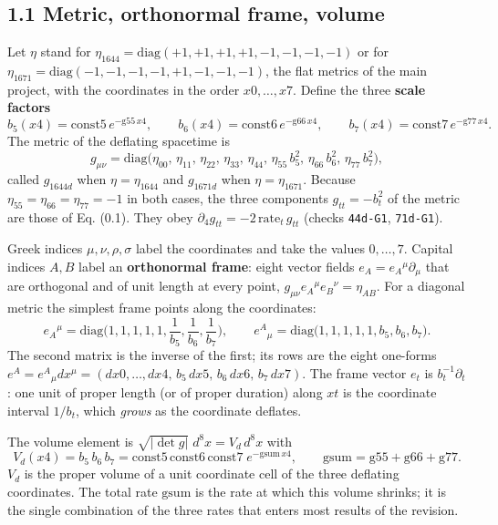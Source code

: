 \documentclass[
  10pt,
]{article}
\begin{document}
\hypertarget{metric-orthonormal-frame-volume}{%
\subsection{1.1 Metric, orthonormal frame,
volume}\label{metric-orthonormal-frame-volume}}

Let \(\eta\) stand for
\(\eta_{1644}=\mathrm{diag}(+1,+1,+1,+1,-1,-1,-1,-1)\) or for
\(\eta_{1671}=\mathrm{diag}(-1,-1,-1,-1,+1,-1,-1,-1)\), the flat metrics
of the main project, with the coordinates in the order \(x0,\dots,x7\).
Define the three \textbf{scale factors}
\[b_5(x4)=\mathrm{const5}\,e^{-\mathrm{g55}\,x4},\qquad
b_6(x4)=\mathrm{const6}\,e^{-\mathrm{g66}\,x4},\qquad
b_7(x4)=\mathrm{const7}\,e^{-\mathrm{g77}\,x4}.\tag{1.1}\] The metric of
the deflating spacetime is
\[g_{\mu\nu}=\mathrm{diag}\big(\eta_{00},\,\eta_{11},\,\eta_{22},\,\eta_{33},\,\eta_{44},\,
\eta_{55}\,b_5^2,\,\eta_{66}\,b_6^2,\,\eta_{77}\,b_7^2\big),\tag{1.2}\]
called \(g_{1644d}\) when \(\eta=\eta_{1644}\) and \(g_{1671d}\) when
\(\eta=\eta_{1671}\). Because \(\eta_{55}=\eta_{66}=\eta_{77}=-1\) in
both cases, the three components \(g_{tt}=-b_t^2\) of the metric are
those of Eq. (0.1). They obey
\(\partial_4g_{tt}=-2\,\mathrm{rate}_t\,g_{tt}\) (checks
\texttt{44d-G1}, \texttt{71d-G1}).

Greek indices \(\mu,\nu,\rho,\sigma\) label the coordinates and take the
values \(0,\dots,7\). Capital indices \(A,B\) label an
\textbf{orthonormal frame}: eight vector fields
\(e_A=e_A{}^\mu\partial_\mu\) that are orthogonal and of unit length at
every point, \(g_{\mu\nu}e_A{}^\mu e_B{}^\nu=\eta_{AB}\). For a diagonal
metric the simplest frame points along the coordinates:
\[e_A{}^\mu=\mathrm{diag}\Big(1,1,1,1,1,\frac1{b_5},\frac1{b_6},\frac1{b_7}\Big),\qquad
e^A{}_\mu=\mathrm{diag}\big(1,1,1,1,1,b_5,b_6,b_7\big).\tag{1.3}\] The
second matrix is the inverse of the first; its rows are the eight
one-forms
\(e^A=e^A{}_\mu dx^\mu=(dx0,\dots,dx4,\,b_5\,dx5,\,b_6\,dx6,\,b_7\,dx7)\).
The frame vector \(e_t\) is \(b_t^{-1}\partial_t\): one unit of proper
length (or of proper duration) along \(xt\) is the coordinate interval
\(1/b_t\), which \emph{grows} as the coordinate deflates.

The volume element is \(\sqrt{\lvert\det g\rvert}\;d^8x=V_d\,d^8x\) with
\[V_d(x4)=b_5\,b_6\,b_7=\mathrm{const5}\,\mathrm{const6}\,\mathrm{const7}\;e^{-\mathrm{gsum}\,x4},
\qquad\mathrm{gsum}=\mathrm{g55}+\mathrm{g66}+\mathrm{g77}.\tag{1.4}\]
\(V_d\) is the proper volume of a unit coordinate cell of the three
deflating coordinates. The total rate \(\mathrm{gsum}\) is the rate at
which this volume shrinks; it is the single combination of the three
rates that enters most results of the revision.
\end{document}
